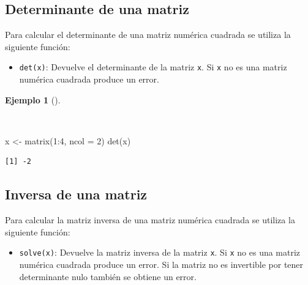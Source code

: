 \documentclass[
  spanish,
  a4paper,
]{scrreport}
\newenvironment{Shaded}{\begin{snugshade}}{\end{snugshade}}
\newcommand{\AttributeTok}[1]{\textcolor[rgb]{0.40,0.45,0.13}{#1}}
\newcommand{\DecValTok}[1]{\textcolor[rgb]{0.68,0.00,0.00}{#1}}
\newcommand{\FunctionTok}[1]{\textcolor[rgb]{0.28,0.35,0.67}{#1}}
\newcommand{\NormalTok}[1]{\textcolor[rgb]{0.00,0.23,0.31}{#1}}
\newcommand{\OtherTok}[1]{\textcolor[rgb]{0.00,0.23,0.31}{#1}}
\newcommand{\SpecialCharTok}[1]{\textcolor[rgb]{0.37,0.37,0.37}{#1}}
\providecommand{\tightlist}{%
  \setlength{\itemsep}{0pt}\setlength{\parskip}{0pt}}
\theoremstyle{definition}
\theoremstyle{definition}
\newtheorem{example}{Ejemplo}[chapter]
\theoremstyle{remark}
\begin{document}
\subsection{Determinante de una
matriz}\label{determinante-de-una-matriz}

Para calcular el determinante de una matriz numérica cuadrada se utiliza
la siguiente función:

\begin{itemize}
\tightlist
\item
  \texttt{det(x)}: Devuelve el determinante de la matriz \texttt{x}. Si
  \texttt{x} no es una matriz numérica cuadrada produce un error.
\end{itemize}

\begin{example}[]\protect\hypertarget{exm-determinante}{}\label{exm-determinante}

~

\begin{Shaded}
\begin{Highlighting}[]
\NormalTok{x }\OtherTok{\textless{}{-}} \FunctionTok{matrix}\NormalTok{(}\DecValTok{1}\SpecialCharTok{:}\DecValTok{4}\NormalTok{, }\AttributeTok{ncol =} \DecValTok{2}\NormalTok{)}
\FunctionTok{det}\NormalTok{(x)}
\end{Highlighting}
\end{Shaded}

\begin{verbatim}
[1] -2
\end{verbatim}

\end{example}

\subsection{Inversa de una matriz}\label{inversa-de-una-matriz}

Para calcular la matriz inversa de una matriz numérica cuadrada se
utiliza la siguiente función:

\begin{itemize}
\tightlist
\item
  \texttt{solve(x)}: Devuelve la matriz inversa de la matriz \texttt{x}.
  Si \texttt{x} no es una matriz numérica cuadrada produce un error. Si
  la matriz no es invertible por tener determinante nulo también se
  obtiene un error.
\end{itemize}
\end{document}
